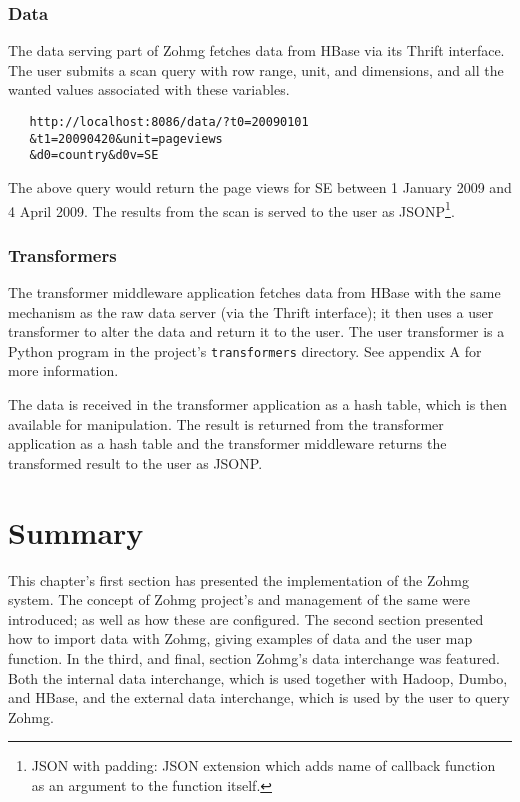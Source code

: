 \subsubsection{Data}

The data serving part of Zohmg fetches data from HBase via its Thrift interface.
The user submits a scan query with row range, unit, and dimensions, and all the
wanted values associated with these variables.

\begin{verbatim}
   http://localhost:8086/data/?t0=20090101
   &t1=20090420&unit=pageviews
   &d0=country&d0v=SE
\end{verbatim}

The above query would return the page views for SE between 1 January
2009 and 4 April 2009. The results from the scan is served to the user as
JSONP\footnote{JSON with padding: JSON extension which adds name of callback
function as an argument to the function itself.}.


\subsubsection{Transformers}

The transformer middleware application fetches data from HBase with the same
mechanism as the raw data server (via the Thrift interface); it then uses a user
transformer to alter the data and return it to the user. The user transformer is
a Python program in the project's \texttt{transformers} directory. See appendix
A for more information.

The data is received in the transformer application as a hash table, which is
then available for manipulation. The result is returned from the transformer
application as a hash table and the transformer middleware returns the
transformed result to the user as JSONP.



\section*{Summary}

This chapter's first section has presented the implementation of the Zohmg
system. The concept of Zohmg project's and management of the same were
introduced; as well as how these are configured. The second section presented
how to import data with Zohmg, giving examples of data and the user map
function. In the third, and final, section Zohmg's data interchange was
featured. Both the internal data interchange, which is used together with
Hadoop, Dumbo, and HBase, and the external data interchange, which is used by
the user to query Zohmg.



